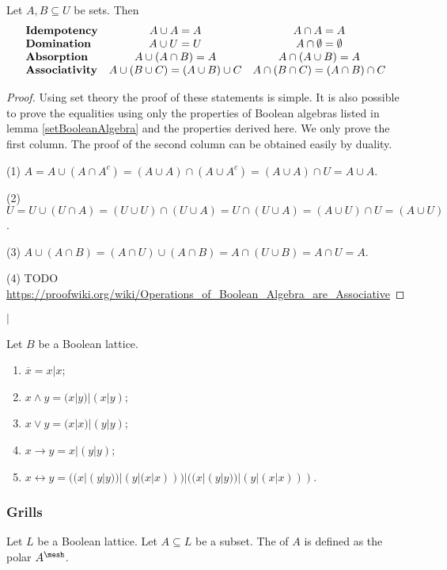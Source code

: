 \begin{corollary} \label{BooleanConsequences}
Let $A,B\subseteq U$ be sets. Then
\[ \begin{array}{l c c}
\text{\textbf{Idempotency}} & A\cup A = A & A\cap A = A \\
\text{\textbf{Domination}} & A\cup U = U & A\cap \emptyset = \emptyset \\
\text{\textbf{Absorption}} & A\cup(A\cap B) = A & A\cap(A\cup B) = A \\
\text{\textbf{Associativity}} & A\cup(B\cup C) = (A\cup B)\cup C & A\cap(B\cap C) = (A\cap B)\cap C
\end{array} \]
\end{corollary}
\begin{proof}
Using set theory the proof of these statements is simple. It is also possible to prove the equalities using only the properties of Boolean algebras listed in lemma \ref{setBooleanAlgebra} and the properties derived here. We only prove the first column. The proof of the second column can be obtained easily by duality.

(1) $A = A\cup(A\cap A^c) = (A\cup A)\cap (A\cup A^c) = (A\cup A)\cap U = A\cup A$.

(2) $U = U\cup (U\cap A) = (U\cup U)\cap (U\cup A) = U\cap (U\cup A) = (A\cup U)\cap U = (A\cup U)$.

(3) $A\cup(A\cap B) = (A\cap U)\cup(A\cap B) = A\cap(U\cup B) = A\cap U = A$.

(4) TODO \url{https://proofwiki.org/wiki/Operations_of_Boolean_Algebra_are_Associative}
\end{proof}

\begin{definition}
 $|$
\end{definition}

\begin{proposition}
Let $B$ be a Boolean lattice.
\begin{enumerate}
\item $\overline{x} = x|x$;
\item $x\wedge y = (x|y)|(x|y)$;
\item $x\vee y = (x|x)|(y|y)$;
\item $x\to y = x|(y|y)$;
\item $x\leftrightarrow y = ((x|(y|y))|(y|(x|x)))|((x|(y|y))|(y|(x|x)))$.
\end{enumerate}
\end{proposition}

\subsubsection{Grills}
\begin{definition}
Let $L$ be a Boolean lattice. Let $A \subseteq L$ be a subset. The  of $A$ is defined as the polar $A^{\mesh}$.
\end{definition}

